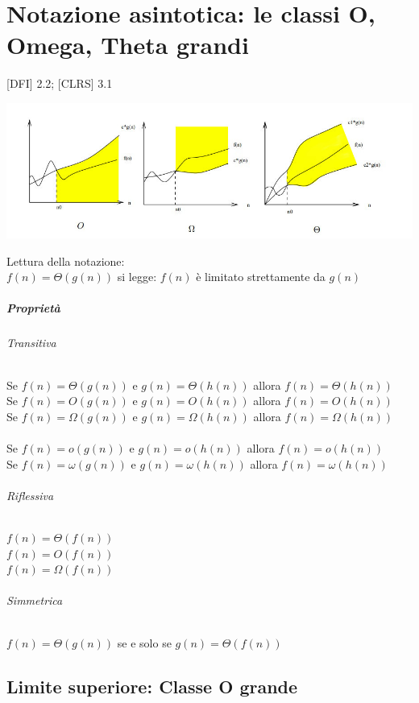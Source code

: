 \chapter{Notazione asintotica: le classi O, Omega, Theta grandi}

{{[}DFI{]} 2.2; {[}CLRS{]} 3.1}

\includegraphics{images/classi_asintotiche.jpg}

Lettura della notazione: \\

$f(n) = \Theta(g(n))$ si legge: $f(n)$ è limitato strettamente da $g(n)$

\paragraph{Proprietà}

\subparagraph{Transitiva}

Se $f(n) = \Theta(g(n))$ e $g(n) = \Theta(h(n))$ allora $f(n) = \Theta(h(n))$ \\
Se $f(n) = O(g(n))$ e $g(n) = O(h(n))$ allora $f(n) = O(h(n))$ \\
Se $f(n) = \Omega(g(n))$ e $g(n) = \Omega(h(n))$ allora $f(n) = \Omega(h(n))$ \\
\\
Se $f(n) = o(g(n))$ e $g(n) = o(h(n))$ allora $f(n) = o(h(n))$ \\
Se $f(n) = \omega(g(n))$ e $g(n) = \omega(h(n))$ allora $f(n) = \omega(h(n))$


\subparagraph{Riflessiva}

$f(n) = \Theta(f(n))$ \\
$f(n) = O(f(n))$ \\
$f(n) = \Omega(f(n))$

\subparagraph{Simmetrica}

$f(n) = \Theta(g(n))$ se e solo se $g(n) = \Theta(f(n))$

\section{Limite superiore: Classe O grande}

